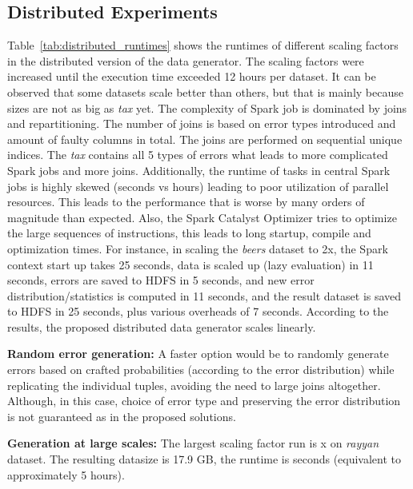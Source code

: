 \subsection{Distributed Experiments}
\label{sec:runtime_distributed}

Table~\ref{tab:distributed_runtimes} shows the runtimes of different scaling factors in the distributed version of the data generator.
The scaling factors were increased until the execution time exceeded 12 hours per dataset.
It can be observed that some datasets scale better than others, but that is mainly because sizes are not as big as \textit{tax} yet. 
The complexity of Spark job is dominated by joins and repartitioning.
The number of joins is based on error types introduced and amount of faulty columns in total.
The joins are performed on sequential unique indices.
The \textit{tax} contains all 5 types of errors what leads to more complicated Spark jobs and more joins.
Additionally, the runtime of tasks in central Spark jobs is highly skewed (seconds vs hours) leading to poor utilization of parallel resources.
This leads to the performance that is worse by many orders of magnitude than expected.
Also, the Spark Catalyst Optimizer tries to optimize the large sequences of instructions, this leads to long startup, compile and optimization times. 
For instance, in scaling the \textit{beers} dataset to 2x, the Spark context start up takes 25 seconds, data is scaled up (lazy evaluation) in 11 seconds, errors are saved to HDFS in 5 seconds, and new error distribution/statistics is computed in 11 seconds, and the result dataset is saved to HDFS in 25 seconds, plus various overheads of 7 seconds.
According to the results, the proposed distributed data generator scales linearly.

\textbf{Random error generation:} 
A faster option would be to randomly generate errors based on crafted probabilities (according to the error distribution) while replicating the individual tuples, avoiding the need to large joins altogether.
Although, in this case, choice of error type and preserving the error distribution is not guaranteed as in the proposed solutions.

\textbf{Generation at large scales:} 
The largest scaling factor run is x on \textit{rayyan} dataset. 
The resulting datasize is 17.9 GB, the runtime is  seconds (equivalent to approximately 5 hours).

